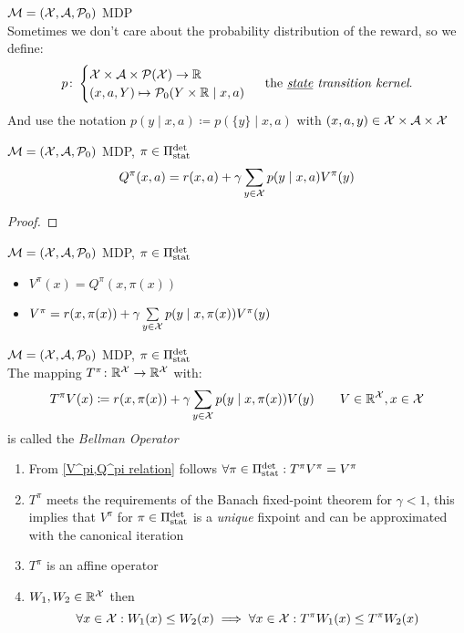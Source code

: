 \begin{definition}\(\mathcal{M}=(\mathcal{X},\mathcal{A},\mathcal{P}_0)\) MDP\\
Sometimes we don't care about the probability distribution of the reward, so we define:
	\[
	p\colon 
	\begin{cases}
		\mathcal{X}\times\mathcal{A}\times\mathcal{P}(\mathcal{X})\to\mathbb{R}\\
		(x,a,Y)\mapsto \mathcal{P}_0(Y\times\mathbb{R}\mid x,a)
	\end{cases}\text{ the \emph{\underline{state} transition kernel}.}
	\] 
And use the notation \(p(y\mid x,a)\coloneqq p(\{y\}\mid x,a)\) with \((x,a,y)\in\mathcal{X}\times\mathcal{A}\times\mathcal{X}\)
\end{definition}
\begin{prop}\(\mathcal{M}=(\mathcal{X},\mathcal{A},\mathcal{P}_0)\) MDP, \(\pi\in\Pi_{\textnormal{stat}}^{\textnormal{det}}\) 
	\[Q^\pi(x,a)=r(x,a)+\gamma\sum_{y\in\mathcal{X}}p(y\mid x,a)V^\pi(y)	\]
\end{prop}
\begin{proof}
\end{proof}
\begin{corollary}\label{V^pi,Q^pi relation}  \(\mathcal{M}=(\mathcal{X},\mathcal{A},\mathcal{P}_0)\) MDP, \(\pi\in\Pi_{\textnormal{stat}}^{\textnormal{det}}\) 
\begin{itemize}
	\item \(V^\pi(x)=Q^\pi(x,\pi(x))\)
	\item \(V^\pi=r(x,\pi(x))+\gamma\sum\limits_{y\in\mathcal{X}}p(y\mid x,\pi(x))V^\pi(y) \)
\end{itemize}
\end{corollary}
\begin{definition}\(\mathcal{M}=(\mathcal{X},\mathcal{A},\mathcal{P}_0)\) MDP, \(\pi\in\Pi_{\textnormal{stat}}^{\textnormal{det}}\) \\
The mapping \(T^\pi\colon\mathbb{R}^{\mathcal{X}}\to\mathbb{R}^{\mathcal{X}}\) with:
	\[
	T^\pi V(x)\coloneqq r(x,\pi(x))+\gamma\sum_{y\in\mathcal{X}}p(y\mid x,\pi(x)) V(y)\qquad V\in\mathbb{R}^{\mathcal{X}}, x\in\mathcal{X}
	\]
is called the \emph{Bellman Operator}
\end{definition}
\begin{remark}\leavevmode
	\begin{enumerate}
	\item From \ref{V^pi,Q^pi relation} follows \(\forall\pi\in\Pi_{\textnormal{stat}}^{\textnormal{det}} : T^\pi V^\pi=V^\pi\)
	\item \(T^\pi\) meets the requirements of the Banach fixed-point theorem for \({\gamma<1}\), this implies that \(V^\pi\) for \(\pi\in\Pi_{\textnormal{stat}}^{\textnormal{det}}\)
	is a \emph{unique} fixpoint and can be approximated with the canonical iteration
	\item \(T^\pi\) is an affine operator
	\item \(W_1,W_2\in\mathbb{R}^{\mathcal{X}}\) then 
	\[\forall x\in\mathcal{X}:W_1(x)\le W_2(x) \implies \forall x\in\mathcal{X}:T^\pi W_1(x)\le T^\pi W_2(x)\]
	\end{enumerate}
\end{remark}
